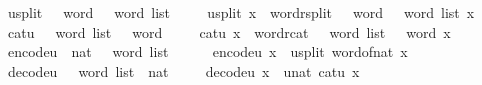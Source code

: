 \begin{isabellebody}
\isanewline
{}\isamarkupfalse%
\ u{}{}{\isacharunderscore}{\kern0pt}split\ {\isacharcolon}{\kern0pt}{\isacharcolon}{\kern0pt}\ {\isachardoublequoteopen}{}{}\ word\ {\isasymRightarrow}\ {}\ word\ list{\isachardoublequoteclose}\isanewline
\ \ \isanewline
\ \ {\isachardoublequoteopen}u{}{}{\isacharunderscore}{\kern0pt}split\ x\ {\isasymequiv}\ {\isacharparenleft}{\kern0pt}word{\isacharunderscore}{\kern0pt}rsplit\ {\isacharcolon}{\kern0pt}{\isacharcolon}{\kern0pt}\ {}{}\ word\ {\isasymRightarrow}\ {}\ word\ list{\isacharparenright}{\kern0pt}\ x{\isachardoublequoteclose}\isanewline
\isanewline
{}\isamarkupfalse%
\ cat{\isacharunderscore}{\kern0pt}u{}{}\ {\isacharcolon}{\kern0pt}{\isacharcolon}{\kern0pt}\ {\isachardoublequoteopen}{}\ word\ list\ {\isasymRightarrow}\ {}{}\ word{\isachardoublequoteclose}\isanewline
\ \ \isanewline
\ \ {\isachardoublequoteopen}cat{\isacharunderscore}{\kern0pt}u{}{}\ x\ {\isasymequiv}\ {\isacharparenleft}{\kern0pt}word{\isacharunderscore}{\kern0pt}rcat\ {\isacharcolon}{\kern0pt}{\isacharcolon}{\kern0pt}\ {}\ word\ list\ {\isasymRightarrow}\ {}{}\ word{\isacharparenright}{\kern0pt}\ x{\isachardoublequoteclose}\isanewline
\isanewline
{}\isamarkupfalse%
\ encode{\isacharunderscore}{\kern0pt}u{}{}\ {\isacharcolon}{\kern0pt}{\isacharcolon}{\kern0pt}\ {\isachardoublequoteopen}nat\ {\isasymRightarrow}\ {}\ word\ list{\isachardoublequoteclose}\isanewline
\ \ \ \isanewline
\ \ {\isachardoublequoteopen}encode{\isacharunderscore}{\kern0pt}u{}{}\ x\ {\isasymequiv}\ u{}{}{\isacharunderscore}{\kern0pt}split\ {\isacharparenleft}{\kern0pt}word{\isacharunderscore}{\kern0pt}of{\isacharunderscore}{\kern0pt}nat\ x{\isacharparenright}{\kern0pt}{\isachardoublequoteclose}\isanewline
\isanewline
{}\isamarkupfalse%
\ decode{\isacharunderscore}{\kern0pt}u{}{}\ {\isacharcolon}{\kern0pt}{\isacharcolon}{\kern0pt}\ {\isachardoublequoteopen}{}\ word\ list\ {\isasymRightarrow}\ nat{\isachardoublequoteclose}\isanewline
\ \ \isanewline
\ \ {\isachardoublequoteopen}decode{\isacharunderscore}{\kern0pt}u{}{}\ x\ {\isasymequiv}\ unat\ {\isacharparenleft}{\kern0pt}cat{\isacharunderscore}{\kern0pt}u{}{}\ x{\isacharparenright}{\kern0pt}{\isachardoublequoteclose}\isanewline

\end{isabellebody}
